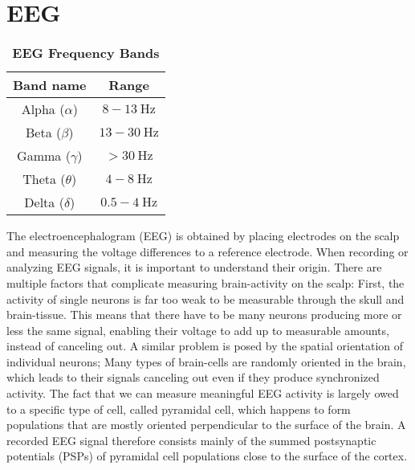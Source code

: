 \section{EEG}\label{sec:eeg}
\begin{wraptable}{r}{5.5cm}
    \centering
    \begin{tabular}{ |c|c| }
        \hline
        \textbf{Band name} & \textbf{Range} \\
        \hline
        \hline
        Alpha ($\alpha$) & $8-\SI{13}{\hertz}$ \\
        \hline
        Beta ($\beta$) & $13-\SI{30}{\hertz}$ \\
        \hline
        Gamma ($\gamma$) & $>\SI{30}{\hertz}$ \\
        \hline
        Theta ($\theta$) & $4-\SI{8}{\hertz}$ \\
        \hline
        Delta ($\delta$) & $0.5-\SI{4}{\hertz}$ \\

        \hline
    \end{tabular}
    \caption{\textbf{EEG Frequency Bands}}
    \label{table:freq-bands}
\end{wraptable}
The electroencephalogram (EEG) is obtained by placing electrodes on the scalp and
measuring the voltage differences to a reference electrode.
When recording or analyzing EEG signals,
it is important to understand their origin.
There are multiple factors that complicate measuring brain-activity on the scalp:
First, the activity of single neurons is far too weak to be measurable through the skull and brain-tissue.
This means that there have to be many neurons producing more or less the same signal,
enabling their voltage to add up to measurable amounts, instead of canceling out.
A similar problem is posed by the spatial orientation of individual neurons;
Many types of brain-cells are randomly oriented in the brain,
which leads to their signals canceling out even if they produce synchronized activity.
The fact that we can measure meaningful EEG activity is largely owed to a specific type of cell,
called pyramidal cell,
which happens to form populations that are mostly oriented perpendicular to the surface of the brain.
A recorded EEG signal therefore consists mainly of the summed postsynaptic potentials (PSPs) of pyramidal cell populations
close to the surface of the cortex.
\cite[9--20]{mecarelli_clinical_2019}


